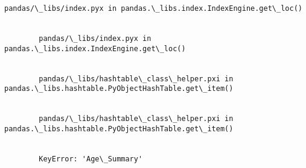 \documentclass[11pt]{article}
\begin{document}
\begin{Verbatim}[commandchars=\\\{\}]
        pandas/\_libs/index.pyx in pandas.\_libs.index.IndexEngine.get\_loc()
    

        pandas/\_libs/index.pyx in pandas.\_libs.index.IndexEngine.get\_loc()
    

        pandas/\_libs/hashtable\_class\_helper.pxi in pandas.\_libs.hashtable.PyObjectHashTable.get\_item()
    

        pandas/\_libs/hashtable\_class\_helper.pxi in pandas.\_libs.hashtable.PyObjectHashTable.get\_item()
    

        KeyError: 'Age\_Summary'

    \end{Verbatim}


    
    
    
    
\end{document}
